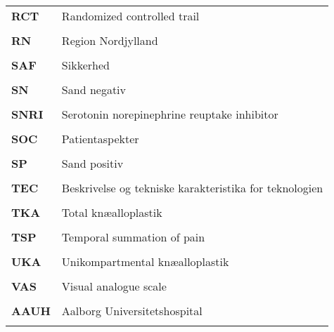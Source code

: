 \begin{longtable}{p{}  p{}}
\textbf{RCT} & Randomized controlled trail
\\ \\
\textbf{RN}  & Region Nordjylland                                             
\\ \\
\textbf{SAF} & Sikkerhed                                                
\\ \\
\textbf{SN}  & Sand negativ                                            
\\ \\
\textbf{SNRI}& Serotonin norepinephrine reuptake inhibitor              
\\ \\
\textbf{SOC} & Patientaspekter                             
\\ \\
\textbf{SP}  & Sand positiv                                          
\\ \\
\textbf{TEC} & Beskrivelse og tekniske karakteristika for teknologien   
\\ \\
\textbf{TKA} & Total knæalloplastik                                     
\\ \\
\textbf{TSP} & Temporal summation of pain                               
\\ \\
\textbf{UKA} & Unikompartmental knæalloplastik                          
\\ \\
\textbf{VAS} & Visual analogue scale
\\ \\
\textbf{AAUH}& Aalborg Universitetshospital                             
\\ \\
\end{longtable}
